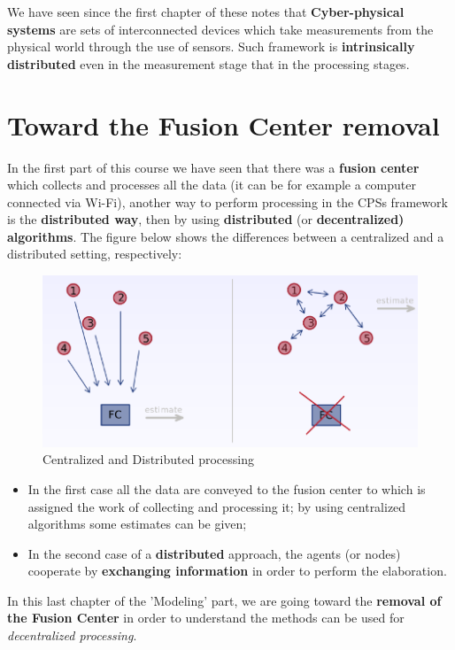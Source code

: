 We have seen since the first chapter of these notes that \textbf{Cyber-physical systems} are sets of interconnected devices which
take measurements from the physical world through the use of sensors. Such framework is \textbf{intrinsically distributed} even in the measurement stage that in the processing stages.
\section{Toward the Fusion Center removal}


\noindent
In the first part of this course we have seen that there was a 
\textbf{fusion center} which collects and processes all the data (it can be for example a computer connected via Wi-Fi), another way to perform processing in the CPSs framework is the \textbf{distributed way}, then by using \textbf{distributed} (or \textbf{decentralized) algorithms}. The figure below shows the differences between a centralized and a distributed setting, respectively:

\begin{figure}[h]
    \centering
    \includegraphics[scale=0.6]{images/Dist_Centr.png}
    \caption{Centralized and Distributed processing}
\end{figure}
\begin{itemize}
    \item In the first case all the data are conveyed to the fusion center to which is assigned the work of collecting and processing it; by using centralized algorithms some estimates can be given;
    \item In the second case of a \textbf{distributed} approach, the agents (or nodes)  cooperate by \textbf{exchanging information} in order to perform the elaboration.
\end{itemize}
In this last chapter of the 'Modeling' part, we are going toward the \textbf{removal of the Fusion Center} in order to understand the methods can be used for \textit{decentralized processing}.


